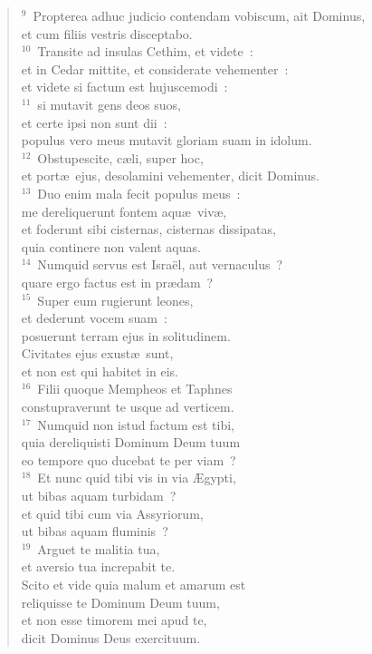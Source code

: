 \begin{verse}
${}^{9}$~Propterea adhuc judicio contendam vobiscum, ait Dominus,\\ et cum filiis vestris disceptabo.\\
${}^{10}$~Transite ad insulas Cethim, et videte~:\\ et in Cedar mittite, et considerate vehementer~:\\ et videte si factum est hujuscemodi~:\\
${}^{11}$~si mutavit gens deos suos,\\ et certe ipsi non sunt dii~:\\ populus vero meus mutavit gloriam suam in idolum.\\
${}^{12}$~Obstupescite, c\ae li, super hoc,\\ et port\ae\ ejus, desolamini vehementer, dicit Dominus.\\
${}^{13}$~Duo enim mala fecit populus meus~:\\ me dereliquerunt fontem aqu\ae\ viv\ae ,\\ et foderunt sibi cisternas, cisternas dissipatas,\\ quia continere non valent aquas.\\
${}^{14}$~Numquid servus est Isra\"el, aut vernaculus~?\\ quare ergo factus est in pr\ae dam~?\\
${}^{15}$~Super eum rugierunt leones,\\ et dederunt vocem suam~:\\ posuerunt terram ejus in solitudinem.\\ Civitates ejus exust\ae\ sunt,\\ et non est qui habitet in eis.\\
${}^{16}$~Filii quoque Mempheos et Taphnes\\ constupraverunt te usque ad verticem.\\
${}^{17}$~Numquid non istud factum est tibi,\\ quia dereliquisti Dominum Deum tuum\\ eo tempore quo ducebat te per viam~?\\
${}^{18}$~Et nunc quid tibi vis in via \AE gypti,\\ ut bibas aquam turbidam~?\\ et quid tibi cum via Assyriorum,\\ ut bibas aquam fluminis~?\\
${}^{19}$~Arguet te malitia tua,\\ et aversio tua increpabit te.\\ Scito et vide quia malum et amarum est\\ reliquisse te Dominum Deum tuum,\\ et non esse timorem mei apud te,\\ dicit Dominus Deus exercituum.\\

\end{verse}
